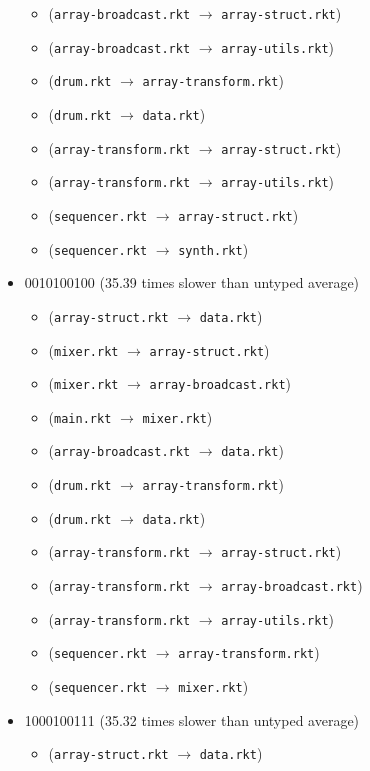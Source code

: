 \documentclass{article}
\newcommand{\mono}[1]{\texttt{#1}}
\begin{document}
\begin{itemize}
\begin{itemize}
  \item (\mono{array-broadcast.rkt} $\rightarrow$ \mono{array-struct.rkt})
  \item (\mono{array-broadcast.rkt} $\rightarrow$ \mono{array-utils.rkt})
  \item (\mono{drum.rkt} $\rightarrow$ \mono{array-transform.rkt})
  \item (\mono{drum.rkt} $\rightarrow$ \mono{data.rkt})
  \item (\mono{array-transform.rkt} $\rightarrow$ \mono{array-struct.rkt})
  \item (\mono{array-transform.rkt} $\rightarrow$ \mono{array-utils.rkt})
  \item (\mono{sequencer.rkt} $\rightarrow$ \mono{array-struct.rkt})
  \item (\mono{sequencer.rkt} $\rightarrow$ \mono{synth.rkt})
  \end{itemize}
\item 0010100100 (35.39 times slower than untyped average)
  \begin{itemize}
  \item (\mono{array-struct.rkt} $\rightarrow$ \mono{data.rkt})
  \item (\mono{mixer.rkt} $\rightarrow$ \mono{array-struct.rkt})
  \item (\mono{mixer.rkt} $\rightarrow$ \mono{array-broadcast.rkt})
  \item (\mono{main.rkt} $\rightarrow$ \mono{mixer.rkt})
  \item (\mono{array-broadcast.rkt} $\rightarrow$ \mono{data.rkt})
  \item (\mono{drum.rkt} $\rightarrow$ \mono{array-transform.rkt})
  \item (\mono{drum.rkt} $\rightarrow$ \mono{data.rkt})
  \item (\mono{array-transform.rkt} $\rightarrow$ \mono{array-struct.rkt})
  \item (\mono{array-transform.rkt} $\rightarrow$ \mono{array-broadcast.rkt})
  \item (\mono{array-transform.rkt} $\rightarrow$ \mono{array-utils.rkt})
  \item (\mono{sequencer.rkt} $\rightarrow$ \mono{array-transform.rkt})
  \item (\mono{sequencer.rkt} $\rightarrow$ \mono{mixer.rkt})
  \end{itemize}
\item 1000100111 (35.32 times slower than untyped average)
  \begin{itemize}
  \item (\mono{array-struct.rkt} $\rightarrow$ \mono{data.rkt})

\end{itemize}
\end{itemize}
\end{document}
